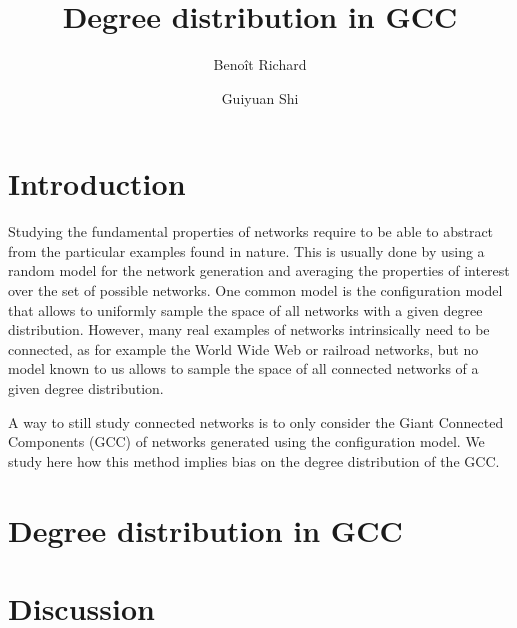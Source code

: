 \documentclass[a4paper]{article}
\title{Degree distribution in GCC}
\author{Benoît Richard \and Guiyuan Shi}
\begin{document}
\listoftodos

\maketitle


\section{Introduction}

Studying the fundamental properties of networks require to be able to abstract from the particular examples found in nature. This is usually done \missingref by using a random model for the network generation and averaging the properties of interest over the set of possible networks. One common model is the configuration model \missingref that allows to uniformly sample the space of all networks with a given degree distribution\missingref. However, many real examples of networks intrinsically need to be connected, as for example the World Wide Web or railroad networks, but no model known to us allows to sample the space of all connected networks of a given degree distribution.

A way to still study connected networks is to only consider the Giant Connected Components (GCC) of networks generated using the configuration model\missingref. We study here how this method implies bias on the degree distribution of the GCC.

\section{Degree distribution in GCC}

\section{Discussion}
\end{document}
